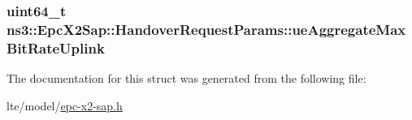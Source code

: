 \subsubsection[{\texorpdfstring{ue\+Aggregate\+Max\+Bit\+Rate\+Uplink}{ueAggregateMaxBitRateUplink}}]{\setlength{\rightskip}{0pt plus 5cm}uint64\+\_\+t ns3\+::\+Epc\+X2\+Sap\+::\+Handover\+Request\+Params\+::ue\+Aggregate\+Max\+Bit\+Rate\+Uplink}\hypertarget{structns3_1_1EpcX2Sap_1_1HandoverRequestParams_a73b26a46b6dfa2ab871d33a81ea6c100}{}\label{structns3_1_1EpcX2Sap_1_1HandoverRequestParams_a73b26a46b6dfa2ab871d33a81ea6c100}


The documentation for this struct was generated from the following file\+:\begin{DoxyCompactItemize}
\item 
lte/model/\hyperlink{epc-x2-sap_8h}{epc-\/x2-\/sap.\+h}\end{DoxyCompactItemize}
